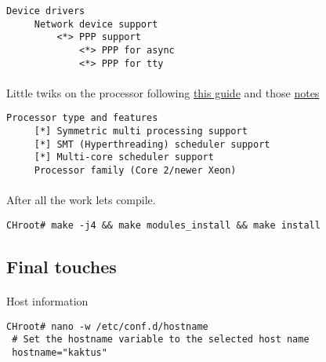 \documentclass[10pt,a4paper]{article}
\begin{document}
                \begin{lstlisting}[style=KernelConfig]
 Device drivers
     Network device support
         <*> PPP support
             <*> PPP for async
             <*> PPP for tty 
                \end{lstlisting}
                
                \newpage
                \paragraph{} Little twiks on the processor following \href{https://wiki.gentoo.org/wiki/Kernel/Gentoo_Kernel_Configuration_Guide#Multiprocessor.2C_Hyper-Threading_and_multi-core_systems}{this guide} and those \href{https://forums.gentoo.org/viewtopic-t-939150-start-0.html}{notes}
                
                \begin{lstlisting}[style=KernelConfig]
 Processor type and features
     [*] Symmetric multi processing support
     [*] SMT (Hyperthreading) scheduler support
     [*] Multi-core scheduler support
     Processor family (Core 2/newer Xeon)
                \end{lstlisting}
                
                \newpage
                \paragraph{} After all the work lets compile. 
                
                \begin{lstlisting}[style=BashInputCHRoot]
 CHroot# make -j4 && make modules_install && make install
                \end{lstlisting}
             
            \newpage
            \subsection{Final touches}

                \paragraph{} Host information
                \begin{lstlisting}[style=BashInputCHRoot]
 CHroot# nano -w /etc/conf.d/hostname
 # Set the hostname variable to the selected host name
 hostname="kaktus"
                \end{lstlisting}
                
\end{document}
